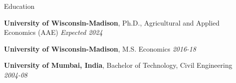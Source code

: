 \documentclass{resume} %
\begin{document}

\begin{rSection}{Education}

{\bf University of Wisconsin-Madison}, Ph.D., Agricultural and Applied Economics (AAE) \hfill {\em Expected 2024} 


{\bf University of Wisconsin-Madison}, M.S. Economics \hfill {\em 2016-18}

{\bf University of Mumbai, India}, Bachelor of Technology, Civil Engineering \hfill {\em 2004-08}

\end{rSection}


	
\end{document}
